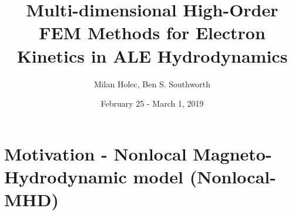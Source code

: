 \documentclass[8pt, compress]{beamer}
\title{{\Huge Multi-dimensional High-Order FEM Methods for Electron Kinetics in ALE Hydrodynamics}}
\date{{\Huge February 25 - March 1, 2019}}
\author[Last Name]{{\Huge Milan Holec, Ben S. Southworth}}
\newcommand{\vect}[1]{\boldsymbol{#1}}
\newcommand{\dI}{\text{d}}
\newcommand{\E}{\vect{E}}
\newcommand{\Te}{T_e}
\begin{document}
\begin{frame}
 \titlepage
\end{frame}

\begin{frame}
  \tableofcontents
\end{frame}

\section{Motivation - Nonlocal Magneto-Hydrodynamic model (Nonlocal-MHD)}

\end{document}
